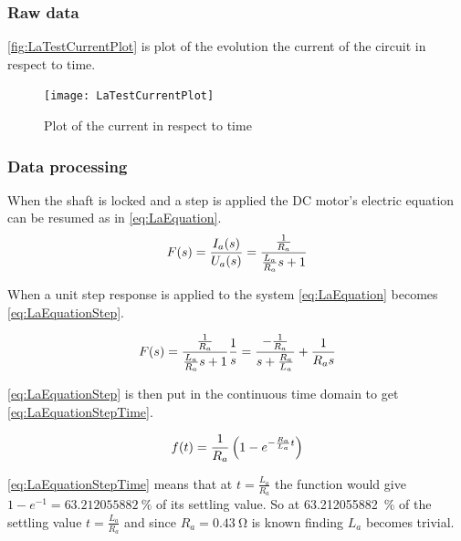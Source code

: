 \subsubsection*{Raw data}
\autoref{fig:LaTestCurrentPlot} is plot of the evolution the current of the circuit in respect to time.

\begin{figure}[htbp]
	\centering
	\texttt{[image: LaTestCurrentPlot]}
	\caption{Plot of the current in respect to time}\label{fig:LaTestCurrentPlot}
\end{figure}

\subsubsection*{Data processing}
When the shaft is locked and a step is applied the DC motor's electric equation can be resumed as in \autoref{eq:LaEquation}.
\begin{equation}
	F(s)=\frac{I_a(s)}{U_a(s)}=\frac{\frac{1}{R_a}}{\frac{L_a}{R_a} s+1} \addunit{1}
	\label{eq:LaEquation}
\end{equation}
\startexplain
{}
\stopexplain

When a unit step response is applied to the system \autoref{eq:LaEquation} becomes \autoref{eq:LaEquationStep}.

\begin{equation}
F(s)=\frac{\frac{1}{R_a}}{\frac{L_a}{R_a} s+1}\frac{1}{s}=\frac{-\frac{1}{R_a}}{s+\frac{R_a}{L_a}}+\frac{1}{R_a s} \addunit{1}
\label{eq:LaEquationStep}
\end{equation}

\autoref{eq:LaEquationStep} is then put in the continuous time domain to get \autoref{eq:LaEquationStepTime}.

\begin{equation}
f(t)= \frac{1}{R_a} \left(1-e^{-\frac{R_a}{L_a} t}\right) \addunit{1}
\label{eq:LaEquationStepTime}
\end{equation}

\autoref{eq:LaEquationStepTime} means that at $t=\frac{L_a}{R_a}$ the function would give $1-e^{-1}=\SI{63.212055882}{\percent}$ of its settling value. So at \SI{63.212055882}{\percent} of the settling value $t=\frac{L_a}{R_a}$ and since $R_a=\SI{0.43}{\ohm}$ \cite{datasheet:saradc} is known finding $L_a$ becomes trivial.

